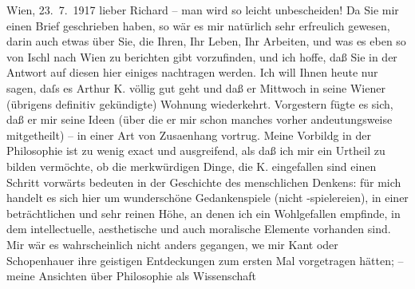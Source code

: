 \pstart
           \raggedleft{}{\pb}Wien, 23. 7. 1917\pend
           \vspace{0.5em}
\pstart
           lieber Richard – man wird so leicht unbescheiden! Da Sie mir einen
               Brief geschrieben haben, so wär es mir natürlich sehr erfreulich gewesen, darin auch
               etwas über Sie, die Ihren, Ihr Leben, Ihr Arbeiten, und was es eben so von Ischl nach Wien
               zu berichten gibt vorzufinden, und ich hoffe, daß Sie in der Antwort auf diesen hier
               einiges nachtragen werden. Ich will Ihnen heute nur sagen, daſs es Arthur K. völlig gut geht und daß er Mittwoch in seine Wiener (übrigens definitiv gekündigte) Wohnung
               wiederkehrt. Vorgestern fügte es sich, daß er mir seine Ideen (über die er mir schon
               manches vorher andeutungsweise mitgetheilt) – in einer Art von Zusa{\geminationm}enhang vortrug. Meine \strikeout{\textcolor{gray}{×}\-\textcolor{gray}{×}\-\textcolor{gray}{×}\-\textcolor{gray}{×}\-\textcolor{gray}{×}} Vorbildg in der Philosophie \introOben{}ist\introOben{} zu wenig exact und
               ausgreifend, als daß ich mir ein Urtheil zu bilden vermöchte, ob die merkwürdigen
               Dinge, die K. eingefallen sind einen Schritt
               vorwärts bedeuten in der Geschichte des menschlichen Denkens: für mich handelt es
               sich hier um wunderschöne Gedankenspiele (nicht -spielereien), in einer
               beträchtlichen und sehr reinen Höhe, an denen ich ein Wohlgefallen empfinde, in dem
                   intellectuelle, aesthetische und auch moralische
               Elemente vorhanden sind. Mir wär es wahrscheinlich nicht anders gegangen, we{\geminationn} mir Kant oder
                  Schopenhauer ihre geistigen Entdeckungen zum
               ersten Mal vorgetragen hätten; – meine Ansichten über Philosophie als Wissenschaft
